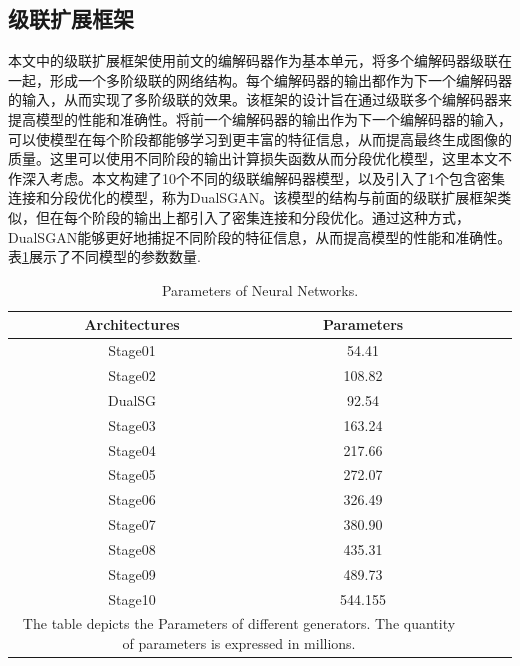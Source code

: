 \documentclass[twocolumn]{article}
\begin{document}
\subsection{级联扩展框架}
本文中的级联扩展框架使用前文的编解码器作为基本单元，将多个编解码器级联在一起，形成一个多阶级联的网络结构。每个编解码器的输出都作为下一个编解码器的输入，从而实现了多阶级联的效果。该框架的设计旨在通过级联多个编解码器来提高模型的性能和准确性。将前一个编解码器的输出作为下一个编解码器的输入，可以使模型在每个阶段都能够学习到更丰富的特征信息，从而提高最终生成图像的质量。这里可以使用不同阶段的输出计算损失函数从而分段优化模型，这里本文不作深入考虑。本文构建了10个不同的级联编解码器模型，以及引入了1个包含密集连接和分段优化的模型，称为DualSGAN。该模型的结构与前面的级联扩展框架类似，但在每个阶段的输出上都引入了密集连接和分段优化。通过这种方式，DualSGAN能够更好地捕捉不同阶段的特征信息，从而提高模型的性能和准确性。表\ref{tab:model_parameters}展示了不同模型的参数数量.

\begin{table}[h]
	\centering
	\caption{Parameters of Neural Networks.}
	\label{tab:model_parameters}
	\begin{tabular}{ccccc}
		\hline
		Architectures & Parameters \\
		\hline
		Stage01       & 54.41      \\
		Stage02       & 108.82     \\
		DualSG      & 92.54      \\
		Stage03       & 163.24     \\
		Stage04       & 217.66     \\
		Stage05       & 272.07     \\
		Stage06       & 326.49     \\
		Stage07       & 380.90     \\
		Stage08       & 435.31     \\
		Stage09       & 489.73     \\
		Stage10       & 544.155    \\
		\hline
		\multicolumn{2}{p{201pt}}{The table depicts the Parameters of different generators. The quantity of parameters is expressed in millions.}
	\end{tabular}
\end{table}
\end{document}
